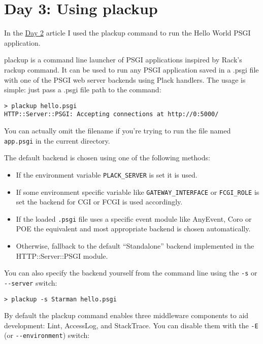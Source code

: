\chapter{Day 3: Using plackup}\label{day-3-using-plackup}

In the
\href{http://advent.plackperl.org/2009/12/day-2-hello-world.html}{Day 2}
article I used the plackup command to run the Hello World PSGI
application.

plackup is a command line launcher of PSGI applications inspired by
Rack's rackup command. It can be used to run any PSGI application saved
in a .psgi file with one of the PSGI web server backends using Plack
handlers. The usage is simple: just pass a .psgi file path to the
command:

\begin{lstlisting}
> plackup hello.psgi
HTTP::Server::PSGI: Accepting connections at http://0:5000/
\end{lstlisting}

You can actually omit the filename if you're trying to run the file
named \lstinline!app.psgi! in the current directory.

The default backend is chosen using one of the following methods:

\begin{itemize}
\itemsep1pt\parskip0pt
\item
  If the environment variable \lstinline!PLACK_SERVER! is set it is
  used.
\item
  If some environment specific variable like
  \lstinline!GATEWAY_INTERFACE! or \lstinline!FCGI_ROLE! is set the
  backend for CGI or FCGI is used accordingly.
\item
  If the loaded \lstinline!.psgi! file uses a specific event module like
  AnyEvent, Coro or POE the equivalent and most appropriate backend is
  chosen automatically.
\item
  Otherwise, fallback to the default ``Standalone'' backend implemented
  in the HTTP::Server::PSGI module.
\end{itemize}

You can also specify the backend yourself from the command line using
the \lstinline!-s! or \lstinline!--server! switch:

\begin{lstlisting}
> plackup -s Starman hello.psgi
\end{lstlisting}

By default the plackup command enables three middleware components to
aid development: Lint, AccessLog, and StackTrace. You can disable them
with the \lstinline!-E! (or \lstinline!--environment!) switch:

